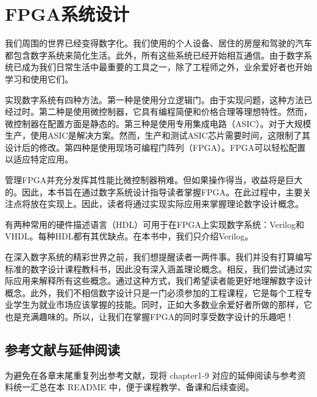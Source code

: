 \section*{FPGA系统设计}\label{fpga系统设计}

我们周围的世界已经变得数字化。我们使用的个人设备、居住的房屋和驾驶的汽车都包含数字系统来简化生活。此外，所有这些系统已经开始相互通信。由于数字系统已成为我们日常生活中最重要的工具之一，除了工程师之外，业余爱好者也开始学习和使用它们。

实现数字系统有四种方法。第一种是使用分立逻辑门。由于实现问题，这种方法已经过时。第二种是使用微控制器，它具有编程简便和价格合理等理想特性。然而，微控制器在配置方面是静态的。第三种是使用专用集成电路（ASIC）。对于大规模生产，使用ASIC是解决方案。然而，生产和测试ASIC芯片需要时间，这限制了其设计后的修改。第四种是使用现场可编程门阵列（FPGA）。FPGA可以轻松配置以适应特定应用。

管理FPGA并充分发挥其性能比微控制器稍难。但如果操作得当，收益将是巨大的。因此，本书旨在通过数字系统设计指导读者掌握FPGA。在此过程中，主要关注点将放在实现上。因此，读者将通过实现实际应用来掌握理论数字设计概念。

有两种常用的硬件描述语言（HDL）可用于在FPGA上实现数字系统：Verilog和VHDL。每种HDL都有其优缺点。在本书中，我们只介绍Verilog。

在深入数字系统的精彩世界之前，我们想提醒读者一两件事。我们并没有打算编写标准的数字设计课程教科书，因此没有深入涵盖理论概念。相反，我们尝试通过实际应用来解释所有这些概念。通过这种方式，我们希望读者能更好地理解数字设计概念。此外，我们不相信数字设计只是一门必须参加的工程课程，它是每个工程专业学生为就业市场应该掌握的技能。同时，正如大多数业余爱好者所做的那样，它也是充满趣味的。所以，让我们在掌握FPGA的同时享受数字设计的乐趣吧！

\subsection*{参考文献与延伸阅读}\label{参考文献与延伸阅读}

为避免在各章末尾重复列出参考文献，现将 chapter1-9
对应的延伸阅读与参考资料统一汇总在本 README
中，便于课程教学、备课和后续查阅。

